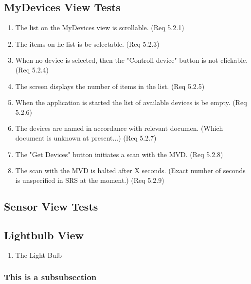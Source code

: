 \documentclass[a4paper]{article}
\begin{document}
\begin{appendices}
\subsection{MyDevices View Tests}
\begin{enumerate}[label=\bfseries Test \thesubsection.\arabic*,labelwidth=\widthof{\text{Test 10.10.10}},leftmargin=!]
	\item The list on the MyDevices view is scrollable. (Req 5.2.1)
    \item The items on he list is be selectable. (Req 5.2.3)
    \item When no device is selected, then the "Controll device" button is not clickable. (Req 5.2.4)
    \item The screen displays the number of items in the list. (Req 5.2.5)
    \item When the application is started the list of available devices is be empty. (Req 5.2.6)
    \item The devices are named in accordance with relevant documen. (Which document is unknown at present...) (Req 5.2.7)
    \item The "Get Devices" button initiates a scan with the MVD. (Req 5.2.8)
    \item The scan with the MVD is halted after X seconds. (Exact number of seconds is unspecified in SRS at the moment.) (Req 5.2.9)
\end{enumerate}

\subsection{Sensor View Tests}

\subsection{Lightbulb View}
\begin{enumerate}[label=\bfseries Test \thesubsection.\arabic*,labelwidth=\widthof{\text{Test 10.10.10}},leftmargin=!]
	\item The Light Bulb 
\end{enumerate}	

\subsubsection{This is a subsubsection}

\end{appendices}
\end{document}
